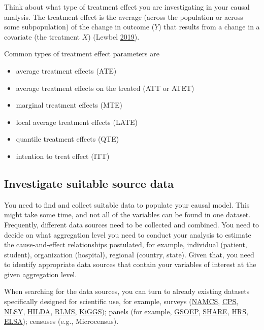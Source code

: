 \documentclass[
]{book}
\providecommand{\tightlist}{%
  \setlength{\itemsep}{0pt}\setlength{\parskip}{0pt}}
\begin{document}
Think about what type of treatment effect you are investigating in your
causal analysis. The treatment effect is the average (across the
population or across some subpopulation) of the change in outcome
(\(Y\)) that results from a change in a covariate (the treatment \(X\))
(Lewbel \protect\hyperlink{ref-lewbel_identification_2019}{2019}).

Common types of treatment effect parameters are

\begin{itemize}
\tightlist
\item
  average treatment effects (ATE)
\item
  average treatment effects on the treated (ATT or ATET)
\item
  marginal treatment effects (MTE)
\item
  local average treatment effects (LATE)
\item
  quantile treatment effects (QTE)
\item
  intention to treat effect (ITT)
\end{itemize}

\hypertarget{investigate-suitable-source-data}{%
\subsection{Investigate suitable source
data}\label{investigate-suitable-source-data}}

You need to find and collect suitable data to populate your causal
model. This might take some time, and not all of the variables can be
found in one dataset. Frequently, different data sources need to be
collected and combined. You need to decide on what aggregation level you
need to conduct your analysis to estimate the cause-and-effect
relationships postulated, for example, individual (patient, student),
organization (hospital), regional (country, state). Given that, you need
to identify appropriate data sources that contain your variables of
interest at the given aggregation level.

When searching for the data sources, you can turn to already existing
datasets specifically designed for scientific use, for example, surveys
(\href{https://www.cdc.gov/nchs/ahcd/ahcd_questionnaires.htm}{NAMCS},
\href{https://www.census.gov/programs-surveys/cps.html}{CPS},
\href{https://www.nlsinfo.org/}{NLSY},
\href{https://melbourneinstitute.unimelb.edu.au/hilda}{HILDA},
\href{https://rlms-hse.cpc.unc.edu/}{RLMS},
\href{https://www.kiggs-studie.de/english/home.html}{KiGGS}); panels
(for example,
\href{https://www.eui.eu/Research/Library/ResearchGuides/Economics/Statistics/DataPortal/GSOEP}{GSOEP},
\href{http://www.share-project.org/home0.html}{SHARE},
\href{https://hrs.isr.umich.edu/data-products}{HRS},
\href{https://www.elsa-project.ac.uk/}{ELSA}); censuses (e.g.,
Microcensus).
\end{document}

